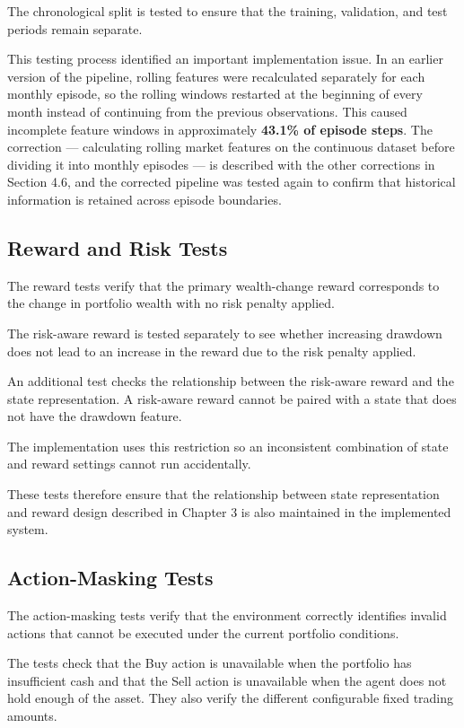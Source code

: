 The chronological split is tested to ensure that the training,
validation, and test periods remain separate.

This testing process identified an important implementation issue. In an
earlier version of the pipeline, rolling features were recalculated
separately for each monthly episode, so the rolling windows restarted at
the beginning of every month instead of continuing from the previous
observations. This caused incomplete feature windows in approximately
\textbf{43.1\% of episode steps}. The correction --- calculating rolling
market features on the continuous dataset before dividing it into
monthly episodes --- is described with the other corrections in Section
4.6, and the corrected pipeline was tested again to confirm that
historical information is retained across episode boundaries.

\subsection{Reward and Risk Tests}

The reward tests verify that the primary wealth-change reward
corresponds to the change in portfolio wealth with no risk penalty
applied.

The risk-aware reward is tested separately to see whether increasing
drawdown does not lead to an increase in the reward due to the risk
penalty applied.

An additional test checks the relationship between the risk-aware reward
and the state representation. A risk-aware reward cannot be paired with
a state that does not have the drawdown feature.

The implementation uses this restriction so an inconsistent combination
of state and reward settings cannot run accidentally.

These tests therefore ensure that the relationship between state
representation and reward design described in Chapter 3 is also
maintained in the implemented system.

\subsection{Action-Masking Tests}

The action-masking tests verify that the environment correctly
identifies invalid actions that cannot be executed under the current
portfolio conditions.

The tests check that the Buy action is unavailable when the portfolio
has insufficient cash and that the Sell action is unavailable when the
agent does not hold enough of the asset. They also verify the different
configurable fixed trading amounts.

